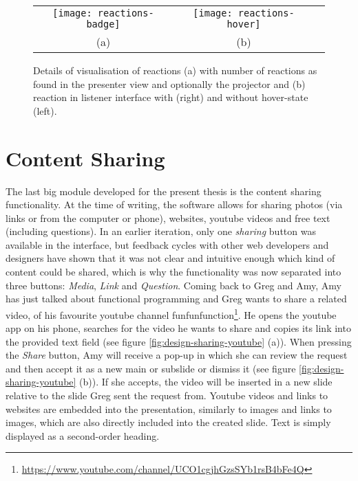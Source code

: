 \begin{figure}
\centering
\begin{tabular}{ccc}
\texttt{[image: reactions-badge]} &
\texttt{[image: reactions-hover]} \\
(a) & (b)
\end{tabular}
\caption{Details of visualisation of reactions (a) with number of reactions as found in the presenter view and optionally the projector and (b) reaction in listener interface with (right) and without hover-state (left).}
\label{fig:design-reactions-details}
\end{figure}

\section{Content Sharing}
The last big module developed for the present thesis is the content sharing functionality. At the time of writing, the software allows for sharing photos (via links or from the computer or phone), websites, youtube videos and free text (including questions). In an earlier iteration, only one \emph{sharing} button was available in the interface, but feedback cycles with other web developers and designers have shown that it was not clear and intuitive enough which kind of content could be shared, which is why the functionality was now separated into three buttons: \emph{Media}, \emph{Link} and \emph{Question}. Coming back to Greg and Amy, Amy has just talked about functional programming and Greg wants to share a related video, of his favourite youtube channel funfunfunction\footnote{\url{https://www.youtube.com/channel/UCO1cgjhGzsSYb1rsB4bFe4Q}}. He opens the youtube app on his phone, searches for the video he wants to share and copies its link into the provided text field (see figure \ref{fig:design-sharing-youtube} (a)). When pressing the \emph{Share} button, Amy will receive a pop-up in which she can review the request and then accept it as a new main or subslide or dismiss it (see figure \ref{fig:design-sharing-youtube} (b)). If she accepts, the video will be inserted in a new slide relative to the slide Greg sent the request from. Youtube videos and links to websites are embedded into the presentation, similarly to images and links to images, which are also directly included into the created slide. Text is simply displayed as a second-order heading.

